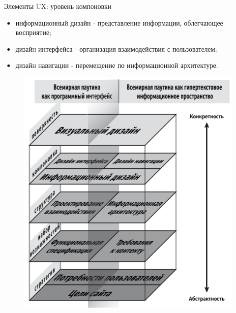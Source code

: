 \documentclass{beamer}
\begin{document}
\begin{frame}{Элементы UX: уровень компоновки}
\begin{itemize}
\item информационный дизайн - представление информации, облегчающее восприятие;
\item дизайн интерфейса - организация взаимодействия с пользователем;
\item дизайн навигации - перемещение по информационной архитектуре.
\end{itemize}
\begin{figure}[h]
\centering
\includegraphics[scale=0.4]{images/lec01-pic12.png}
\end{figure}
\end{frame}
\end{document}

